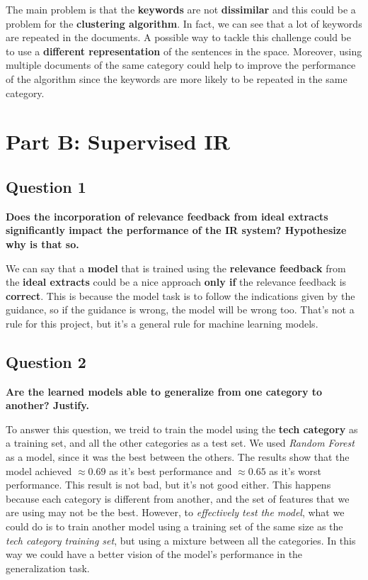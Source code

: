 The main problem is that the \textbf{keywords} are not \textbf{dissimilar} and
this could be a problem for the \textbf{clustering algorithm}. In fact, we can
see that a lot of keywords are repeated in the documents. A possible way to
tackle this challenge could be to use a \textbf{different representation} of
the sentences in the space. Moreover, using multiple documents of the same
category could help to improve the performance of the algorithm since the
keywords are more likely to be repeated in the same category.

\section*{Part B: Supervised IR}
\subsection{Question 1}
\textbf{ Does the incorporation of relevance feedback from ideal extracts significantly impact the performance of the IR system? Hypothesize why is that so.}

We can say that a \textbf{model} that is trained using the \textbf{relevance
  feedback} from the \textbf{ideal extracts} could be a nice approach \textbf{only if} the relevance feedback is \textbf{correct}. This is 
  because the model task is to follow the indications given by the guidance, so if the guidance is wrong, the model will be wrong too. That's 
  not a rule for this project, but it's a general rule for machine learning models.

\subsection{Question 2}
\textbf{ Are the learned models able to generalize from one category to another? Justify.}

To answer this question, we treid to train the model using the \textbf{tech category} as a training set, and 
all the other categories as a test set. We used \textit{Random Forest} as a model, since it was the best between the others.
The results show that the model achieved $\approx 0.69$ as it's best performance and $\approx 0.65$ as it's worst performance. 
This result is not bad, but it's not good either. This happens because each category is different from another, and the set of features 
that we are using may not be the best. However, to \textit{effectively test the model}, what we could do is to train another model 
using a training set of the same size as the \textit{tech category training set}, but using a mixture between all the categories.
In this way we could have a better vision of the model's performance in the generalization task. 


